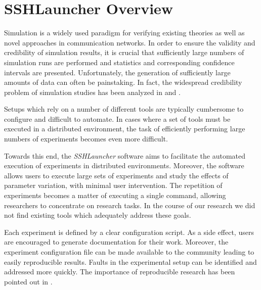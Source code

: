 

\chapter{SSHLauncher Overview}
Simulation is a widely used paradigm for verifying existing theories
as well as novel approaches in communication networks. In order to
ensure the validity and credibility of simulation results, it is
crucial that sufficiently large numbers of simulation runs are
performed and statistics and corresponding confidence intervals are
presented. Unfortunately, the generation of sufficiently large amounts
of data can often be painstaking. In fact, the widespread credibility
problem of simulation studies has been analyzed in \cite{978060} and
\cite{1096174}.

Setups which rely on a number of different tools are typically
cumbersome to configure and difficult to automate. In cases where a
set of tools must be executed in a distributed environment, the task
of efficiently performing large numbers of experiments becomes even
more difficult.

Towards this end, the \emph{SSHLauncher} software aims to facilitate
the automated execution of experiments in distributed
environments. Moreover, the software allows users to execute large
sets of experiments and study the effects of parameter variation, with
minimal user intervention. The repetition of experiments becomes a
matter of executing a single command, allowing researchers to
concentrate on research tasks. In the course of our research we did
not find existing tools which adequately address these goals.


Each experiment is defined by a clear configuration script. As a side
effect, users are encouraged to generate documentation for their
work. Moreover, the experiment configuration file can be made
available to the community leading to easily reproducible
results. Faults in the experimental setup can be identified and
addressed more quickly. The importance of reproducible research has
been pointed out in \cite{schwab00, gentle07}.


